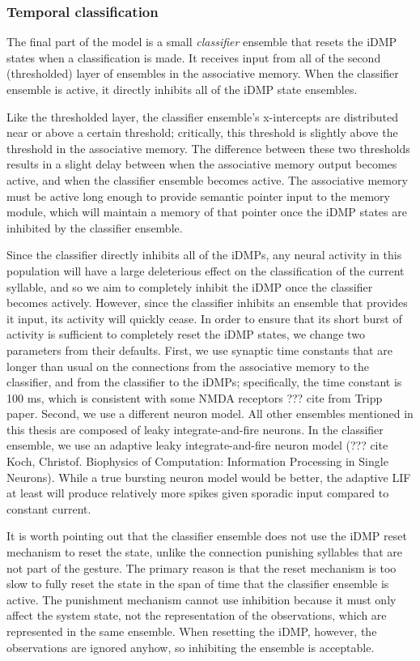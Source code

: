 \subsubsection{Temporal classification}

The final part of the model is
a small \textit{classifier} ensemble
that resets the iDMP states
when a classification is made.
It receives input from all of the
second (thresholded) layer of ensembles
in the associative memory.
When the classifier ensemble is active,
it directly inhibits
all of the iDMP state ensembles.

Like the thresholded layer,
the classifier ensemble's
x-intercepts are distributed
near or above a certain threshold;
critically, this threshold
is slightly above the threshold
in the associative memory.
The difference between these two thresholds
results in a slight delay between
when the associative memory
output becomes active,
and when the classifier ensemble becomes active.
The associative memory
must be active long enough to provide
semantic pointer input to the
memory module,
which will maintain a memory of that pointer
once the iDMP states are inhibited
by the classifier ensemble.

Since the classifier directly inhibits
all of the iDMPs, any neural activity in this population
will have a large deleterious effect
on the classification of the current syllable,
and so we aim to completely inhibit
the iDMP once the classifier becomes actively.
However, since the classifier inhibits
an ensemble that provides it input,
its activity will quickly cease.
In order to ensure that its short burst of activity
is sufficient to completely reset
the iDMP states,
we change two parameters from their defaults.
First, we use synaptic time constants
that are longer than usual on the connections
from the associative memory to the classifier,
and from the classifier to the iDMPs;
specifically, the time constant is 100 ms,
which is consistent with some NMDA receptors
??? cite from Tripp paper.
Second, we use a different neuron model.
All other ensembles mentioned in this thesis
are composed of leaky integrate-and-fire neurons.
In the classifier ensemble,
we use an adaptive leaky integrate-and-fire neuron model
(??? cite Koch, Christof.
Biophysics of Computation: Information Processing in Single Neurons).
While a true bursting neuron model
would be better,
the adaptive LIF at least will produce
relatively more spikes given
sporadic input compared to constant current.

It is worth pointing out that the
classifier ensemble does not use the
iDMP reset mechanism to reset the state,
unlike the connection punishing
syllables that are not part of the gesture.
The primary reason is that the reset mechanism
is too slow to fully reset the state
in the span of time that the classifier ensemble
is active.
The punishment mechanism cannot use inhibition
because it must only affect the system state,
not the representation of the observations,
which are represented in the same ensemble.
When resetting the iDMP, however,
the observations are ignored anyhow,
so inhibiting the ensemble
is acceptable.

